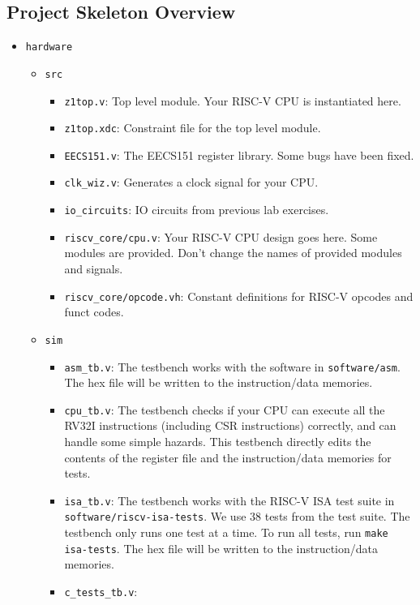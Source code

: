 \subsection{Project Skeleton Overview}
\begin{itemize}
\item \verb|hardware|
  \begin{itemize}
  \item \verb|src|
    \begin{itemize}
    \item \verb|z1top.v|:
      Top level module. Your RISC-V CPU is instantiated here.
    \item \verb|z1top.xdc|:
      Constraint file for the top level module.
    \item \verb|EECS151.v|:
      The EECS151 register library. Some bugs have been fixed.
    \item \verb|clk_wiz.v|:
      Generates a clock signal for your CPU.
    \item \verb|io_circuits|:
      IO circuits from previous lab exercises.
    \item \verb|riscv_core/cpu.v|:
      Your RISC-V CPU design goes here.
      Some modules are provided.
      Don't change the names of provided modules and signals.
    \item \verb|riscv_core/opcode.vh|:
      Constant definitions for RISC-V opcodes and funct codes.
    \end{itemize}
  \item \verb|sim|
    \begin{itemize}
    \item \verb|asm_tb.v|:
      The testbench works with the software in \verb|software/asm|.
      The hex file will be written to the instruction/data memories.
    \item \verb|cpu_tb.v|:
      The testbench checks if your CPU can execute all the RV32I instructions (including CSR instructions) correctly,
      and can handle some simple hazards.
      This testbench directly edits the contents of the register file and the instruction/data memories for tests.
    \item \verb|isa_tb.v|:
      The testbench works with the RISC-V ISA test suite in \\ \verb|software/riscv-isa-tests|.
      We use 38 tests from the test suite.
      The testbench only runs one test at a time.
      To run all tests, run \verb|make isa-tests|.
      The hex file will be written to the instruction/data memories.
    \item \verb|c_tests_tb.v|:

\end{itemize}
\end{itemize}
\end{itemize}
